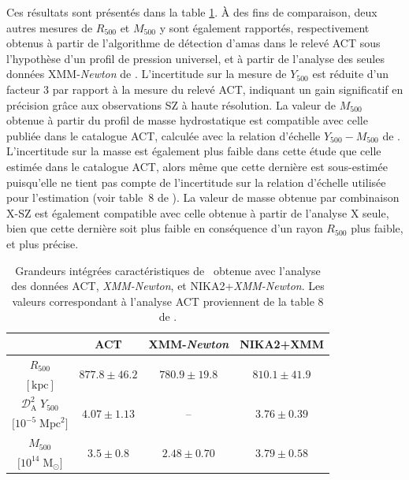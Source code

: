 Ces résultats sont présentés dans la table \ref{tab:act:integ}.
À des fins de comparaison, deux autres mesures de $R_{500}$ et $M_{500}$ y sont également rapportés, respectivement obtenus à partir de l'algorithme de détection d'amas dans le relevé ACT sous l'hypothèse d'un profil de pression universel, et à partir de l'analyse des seules données XMM-\textit{Newton} de \act.
L'incertitude sur la mesure de $Y_{500}$ est réduite d'un facteur 3 par rapport à la mesure du relevé ACT, indiquant un gain significatif en précision grâce aux observations SZ à haute résolution.
La valeur de $M_{500}$ obtenue à partir du profil de masse hydrostatique est compatible avec celle publiée dans le catalogue ACT, calculée avec la relation d'échelle $Y_{500}-M_{500}$ de \cite{arnaud_universal_2010}.
L'incertitude sur la masse est également plus faible dans cette étude que celle estimée dans le catalogue ACT, alors même que cette dernière est sous-estimée puisqu'elle ne tient pas compte de l'incertitude sur la relation d'échelle utilisée pour l'estimation (voir table~8 de \cite{hasselfield_atacama_2013}).
La valeur de masse obtenue par combinaison X-SZ est également compatible avec celle obtenue à partir de l'analyse X seule, bien que cette dernière soit plus faible en conséquence d'un rayon $R_{500}$ plus faible, et plus précise.

\begin{table}[t]
    \centering
    \small
    \begin{tabular}{c c c c}
        \toprule
        &  ACT  &  XMM-\textit{Newton}  &  NIKA2+XMM  \\
        \midrule
        \midrule
        $R_{500}$ & \multirow{2}{*}{$877.8 \pm 46.2$} & \multirow{2}{*}{$780.9 \pm 19.8$} & \multirow{2}{*}{$810.1 \pm 41.9$}  \\
        $[\mathrm{kpc}]$ &  &  &  \\
        \midrule
        $\mathcal{D}_\mathrm{A}^2 \; Y_{500}$ & \multirow{2}{*}{$4.07 \pm 1.13$} & \multirow{2}{*}{--} & \multirow{2}{*}{$3.76 \pm 0.39$} \\
        $\big[10^{-5}\;\mathrm{Mpc}^2\big]$ &  &  &  \\
        \midrule
        $M_{500}$ & \multirow{2}{*}{$3.5 \pm 0.8$} & \multirow{2}{*}{$2.48 \pm 0.70$} & \multirow{2}{*}{$3.79 \pm 0.58$}  \\[3pt]
        $\big[10^{14}\;\mathrm{M}_\odot\big]$ &  &  &  \\
        \bottomrule
    \end{tabular}
    \hspace{20pt}
    \caption{%
        Grandeurs intégrées caractéristiques de \act\ obtenue avec l'analyse des données ACT, \textit{XMM-Newton}, et NIKA2+\textit{XMM-Newton}.
        Les valeurs correspondant à l'analyse ACT proviennent de la table 8 de \cite{hasselfield_atacama_2013}.
    }
    \label{tab:act:integ}
\end{table}


